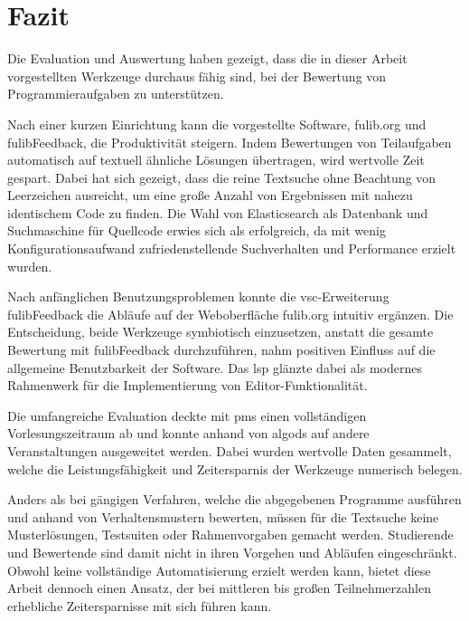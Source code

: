 \chapter{Fazit}\label{ch:conclusion}

Die Evaluation und Auswertung haben gezeigt, dass die in dieser Arbeit vorgestellten Werkzeuge durchaus fähig sind, bei der Bewertung von Programmieraufgaben zu unterstützen.

Nach einer kurzen Einrichtung kann die vorgestellte Software, fulib.org und fulibFeedback, die Produktivität steigern.
Indem Bewertungen von Teilaufgaben automatisch auf textuell ähnliche Lösungen übertragen, wird wertvolle Zeit gespart.
Dabei hat sich gezeigt, dass die reine Textsuche ohne Beachtung von Leerzeichen ausreicht, um eine große Anzahl von Ergebnissen mit nahezu identischem Code zu finden.
Die Wahl von Elasticsearch als Datenbank und Suchmaschine für Quellcode erwies sich als erfolgreich, da mit wenig Konfigurationsaufwand zufriedenstellende Suchverhalten und Performance erzielt wurden.

Nach anfänglichen Benutzungsproblemen konnte die \ac{vsc}-Erweiterung fulibFeedback die Abläufe auf der Weboberfläche fulib.org intuitiv ergänzen.
Die Entscheidung, beide Werkzeuge symbiotisch einzusetzen, anstatt die gesamte Bewertung mit fulibFeedback durchzuführen, nahm positiven Einfluss auf die allgemeine Benutzbarkeit der Software.
Das \acl{lsp} glänzte dabei als modernes Rahmenwerk für die Implementierung von Editor-Funktionalität.

Die umfangreiche Evaluation deckte mit \acp{pm} einen vollständigen Vorlesungszeitraum ab und konnte anhand von \acl{algods} auf andere Veranstaltungen ausgeweitet werden.
Dabei wurden wertvolle Daten gesammelt, welche die Leistungsfähigkeit und Zeitersparnis der Werkzeuge numerisch belegen.

Anders als bei gängigen Verfahren, welche die abgegebenen Programme ausführen und anhand von Verhaltensmustern bewerten, müssen für die Textsuche keine Musterlösungen, Testsuiten oder Rahmenvorgaben gemacht werden.
Studierende und Bewertende sind damit nicht in ihren Vorgehen und Abläufen eingeschränkt.
Obwohl keine vollständige Automatisierung erzielt werden kann, bietet diese Arbeit dennoch einen Ansatz, der bei mittleren bis großen Teilnehmerzahlen erhebliche Zeitersparnisse mit sich führen kann.

